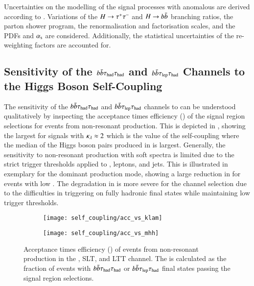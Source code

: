 Uncertainties on the modelling of the signal processes with anomalous
\klambda are derived according to .
Variations of the $H \to \tau^{+} \tau^{-}$ and $H \to b\bar{b}$ branching ratios,
the parton shower program, the renormalisation and factorisation
scales, and the PDFs and $\alpha_{\text{s}}$ are considered. Additionally, the
statistical uncertainties of the \klambda re-weighting factors are
accounted for.


\subsection{Sensitivity of the $b\bar{b}\tau_{\text{had}}\tau_{\text{had}}$ and
  $b\bar{b}\tau_{\text{lep}}\tau_{\text{had}}$ Channels to the Higgs Boson Self-Coupling}%
\label{sec:self_coupling_bbtt_limitations}

The sensitivity of the $b\bar{b}\tau_{\text{had}}\tau_{\text{had}}$ and
$b\bar{b}\tau_{\text{lep}}\tau_{\text{had}}$ channels to \klambda can be understood
qualitatively by inspecting the acceptance times efficiency
(\AccTimesEff) of the signal region selections for events from
non-resonant \HH production. This is depicted in
, showing the largest \AccTimesEff for
signals with $\kappa_{\lambda} \approx 2$ which is the value of the
self-coupling where the median \mHH of the Higgs boson pairs produced
in \ggF is largest. Generally, the sensitivity to non-resonant \HH
production with soft \mHH spectra is limited due to the strict trigger
thresholds applied to \tauhadvis, leptons, and jets. This is
illustrated in  exemplary for the dominant
\ggF production mode, showing a large reduction in \AccTimesEff for
events with low \mHH. The degradation in \AccTimesEff is more severe
for the \hadhad channel selection due to the difficulties in
triggering on fully hadronic final states while maintaining low
trigger thresholds.

\begin{figure}[htbp]
  \centering

  \begin{subfigure}[t]{0.485\textwidth}
    \texttt{[image: self\_coupling/acc\_vs\_klam]}
    \label{fig:acceptance_vs_klambda}
  \end{subfigure}\hfill%
  \begin{subfigure}[t]{0.485\textwidth}
    \texttt{[image: self\_coupling/acc\_vs\_mhh]}
    \label{fig:acceptance_vs_mhh}
  \end{subfigure}

  \caption{Acceptance times efficiency (\AccTimesEff) of events from
    non-resonant \HH production in the \hadhad, \lephad SLT, and
    \lephad LTT channel. The \AccTimesEff is calculated as the
    fraction of events with $b\bar{b}\tau_{\text{had}}\tau_{\text{had}}$ or
    $b\bar{b}\tau_{\text{lep}}\tau_{\text{had}}$ final states passing the signal region
    selections.}%
  \label{fig:acceptance_vs_klambda_vs_mhh}
\end{figure}


